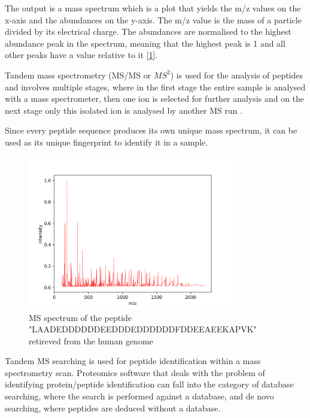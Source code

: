 \documentclass[11pt]{article}
\begin{document}
The output is a mass spectrum which is a plot that yields the m/z values on the x-axis and the abundances on the y-axis. The m/z value is the mass of a particle divided by its electrical charge. The abundances are normalised to the highest abundance peak in the spectrum, meaning that the highest peak is 1 and all other peaks have a value relative to it [\cref{fig:peptide-example}]. 

Tandem mass spectrometry (MS/MS or \(MS^2\)) is used for the analysis of peptides and involves multiple stages, where in the first stage the entire sample is analysed with a mass spectrometer, then one ion is selected for further analysis and on the next stage only this isolated ion is analysed by another MS run \cite{tandem-mass-spectrometry}. 

Since every peptide sequence produces its own unique mass spectrum, it can be used as its unique fingerprint to identify it in a sample. 
\begin{figure}[ht]
\centering
\includegraphics[width=0.8\textwidth]{figs/peptide.png}
\caption{MS spectrum of the peptide "LAADEDDDDDDEEDDDEDDDDDDFDDEEAEEKAPVK" retireved from the human genome}
\label{fig:peptide-example}
\end{figure}

Tandem MS searching is used for peptide identification within a mass spectrometry scan. Proteomics software that deals with the problem of identifying protein/peptide identification can fall into the category of database searching, where the search is performed against a database, and de novo searching, where peptides are deduced without a database.
\end{document}
